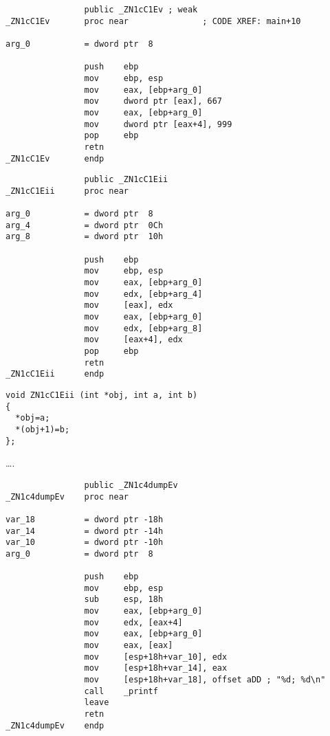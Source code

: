 
\begin{lstlisting}
                public _ZN1cC1Ev ; weak
_ZN1cC1Ev       proc near               ; CODE XREF: main+10

arg_0           = dword ptr  8

                push    ebp
                mov     ebp, esp
                mov     eax, [ebp+arg_0]
                mov     dword ptr [eax], 667
                mov     eax, [ebp+arg_0]
                mov     dword ptr [eax+4], 999
                pop     ebp
                retn
_ZN1cC1Ev       endp
\end{lstlisting}



\begin{lstlisting}
                public _ZN1cC1Eii
_ZN1cC1Eii      proc near

arg_0           = dword ptr  8
arg_4           = dword ptr  0Ch
arg_8           = dword ptr  10h

                push    ebp
                mov     ebp, esp
                mov     eax, [ebp+arg_0]
                mov     edx, [ebp+arg_4]
                mov     [eax], edx
                mov     eax, [ebp+arg_0]
                mov     edx, [ebp+arg_8]
                mov     [eax+4], edx
                pop     ebp
                retn
_ZN1cC1Eii      endp
\end{lstlisting}


\begin{lstlisting}
void ZN1cC1Eii (int *obj, int a, int b)
{
  *obj=a;
  *(obj+1)=b;
};
\end{lstlisting}

\dots {}.


\begin{lstlisting}
                public _ZN1c4dumpEv
_ZN1c4dumpEv    proc near

var_18          = dword ptr -18h
var_14          = dword ptr -14h
var_10          = dword ptr -10h
arg_0           = dword ptr  8

                push    ebp
                mov     ebp, esp
                sub     esp, 18h
                mov     eax, [ebp+arg_0]
                mov     edx, [eax+4]
                mov     eax, [ebp+arg_0]
                mov     eax, [eax]
                mov     [esp+18h+var_10], edx
                mov     [esp+18h+var_14], eax
                mov     [esp+18h+var_18], offset aDD ; "%d; %d\n"
                call    _printf
                leave
                retn
_ZN1c4dumpEv    endp
\end{lstlisting}


